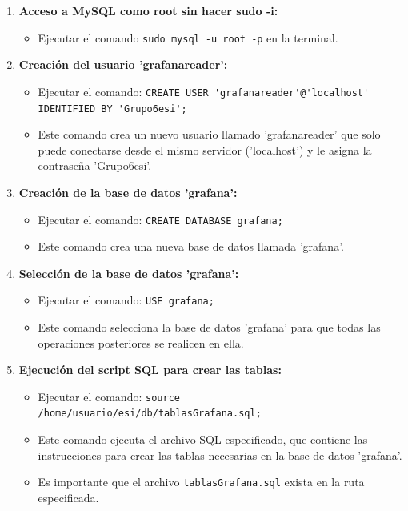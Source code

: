 \documentclass{article}
\begin{document}
\begin{enumerate}
    \item \textbf{Acceso a MySQL como root sin hacer sudo -i:}
    \begin{itemize}
        \item Ejecutar el comando \lstinline{sudo mysql -u root -p} en la terminal.
    \end{itemize}

    \item \textbf{Creación del usuario 'grafanareader':}
    \begin{itemize}
        \item Ejecutar el comando: \lstinline{CREATE USER 'grafanareader'@'localhost' IDENTIFIED BY 'Grupo6esi';}
        \item Este comando crea un nuevo usuario llamado 'grafanareader' que solo puede conectarse desde el mismo servidor ('localhost') y le asigna la contraseña 'Grupo6esi'.
    \end{itemize}

    \item \textbf{Creación de la base de datos 'grafana':}
    \begin{itemize}
        \item Ejecutar el comando: \lstinline{CREATE DATABASE grafana;}
        \item Este comando crea una nueva base de datos llamada 'grafana'.
    \end{itemize}

    \item \textbf{Selección de la base de datos 'grafana':}
    \begin{itemize}
        \item Ejecutar el comando: \lstinline{USE grafana;}
        \item Este comando selecciona la base de datos 'grafana' para que todas las operaciones posteriores se realicen en ella.
    \end{itemize}

    \item \textbf{Ejecución del script SQL para crear las tablas:}
    \begin{itemize}
        \item Ejecutar el comando: \lstinline{source /home/usuario/esi/db/tablasGrafana.sql;}
        \item Este comando ejecuta el archivo SQL especificado, que contiene las instrucciones para crear las tablas necesarias en la base de datos 'grafana'.
        \item Es importante que el archivo \texttt{tablasGrafana.sql} exista en la ruta especificada.
    \end{itemize}


\end{enumerate}
\end{document}
